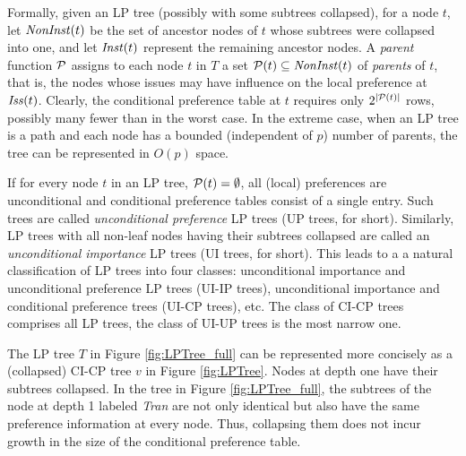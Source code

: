 Formally, given an LP tree (possibly with some subtrees collapsed), for 
a node $t$, let $\mathit{NonInst}(t)$ be the set of ancestor nodes of $t$ whose
subtrees were collapsed into one, and let $\mathit{Inst}(t)$ represent the 
remaining ancestor nodes. A \emph{parent} function $\mathcal{P}$ assigns to 
each node $t$ in $T$ a set $\mathcal{P}(t)\subseteq\mathit{NonInst}(t)$ of \emph{parents}
of $t$, that is, the nodes whose issues may have influence on the local 
preference at $\mathit{Iss}(t)$. Clearly, the conditional preference table at $t$
requires only $2^{|\mathcal{P}(t)|}$ rows, possibly many fewer than in the worst 
case. In the extreme case, when an LP tree is a path and each node has 
a bounded (independent of $p$) number of parents, the tree can be 
represented in $O(p)$ space.

If for every node $t$ in an LP tree, $\mathcal{P}(t)=\emptyset$, all (local)
preferences are unconditional and conditional preference tables consist
of a single entry. Such trees are called \emph{unconditional preference}
LP trees (UP trees, for short). Similarly, LP trees with all non-leaf 
nodes having their subtrees collapsed are called an \emph{unconditional
importance} LP trees (UI trees, for short). This leads to a a natural 
classification of LP trees into four classes: unconditional importance 
and unconditional preference LP trees (UI-IP trees), unconditional 
importance and conditional preference trees (UI-CP trees), etc. The class
of CI-CP trees comprises all LP trees, the class of UI-UP trees is the 
most narrow one. 

The LP tree $T$ in Figure \ref{fig:LPTree_full} can be represented more
concisely as a (collapsed) CI-CP tree $v$ in Figure \ref{fig:LPTree}. Nodes
at depth one have their subtrees collapsed. In the tree in Figure
\ref{fig:LPTree_full}, the subtrees of the node at depth 1 labeled 
\textit{Tran} are not only identical but also have the same preference 
information at every node. Thus, collapsing them does not incur growth in
the size of the conditional preference table.
      
